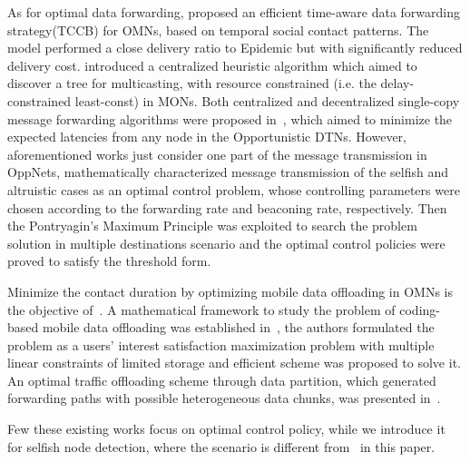As for optimal data forwarding,
\cite{DBLP:journals/tvt/ZhouLZXF17} proposed an
efficient time-aware data forwarding strategy(TCCB) for OMNs,
 based on temporal social contact patterns.
 The model performed a close delivery ratio to
 Epidemic but with significantly reduced delivery cost.
\cite{DBLP:journals/tvt/LiuWXWLY17} introduced
a centralized heuristic algorithm
which aimed to discover a tree for multicasting,
with resource constrained (i.e. the delay-constrained least-const) in MONs.
Both centralized and decentralized single-copy message forwarding algorithms
were proposed in~\cite{DBLP:journals/tsipn/ShaghaghianC15},
which aimed to minimize the expected latencies
from any node in the Opportunistic DTNs.
However, aforementioned works just consider one part of
the message transmission in OppNets,
\cite{DBLP:journals/tcss/WuDH18} mathematically characterized
message transmission of the selfish
and altruistic cases as an optimal control problem,
whose controlling parameters were chosen according
to the forwarding rate and beaconing rate, respectively.
Then the Pontryagin's Maximum Principle was exploited
to search the problem solution in multiple destinations scenario
and the optimal control policies were proved to satisfy the threshold form.

Minimize the contact duration by optimizing
mobile data offloading in OMNs is the objective
of~\cite{DBLP:journals/tits/LiJWZ014,DBLP:conf/icc/WangW18}.
A mathematical framework to study the problem of
coding-based mobile data offloading
was established in~\cite{DBLP:journals/tits/LiJWZ014},
the authors formulated the problem as a users' interest
satisfaction maximization problem
with multiple linear constraints of
limited storage and efficient scheme
was proposed to solve it.
An optimal traffic offloading scheme through
data partition, which generated forwarding paths
with possible heterogeneous data chunks,
was presented in~\cite{DBLP:conf/icc/WangW18}.
\cite{Sacha2016Stalk}

Few these existing works focus on
optimal control policy, while we introduce it
for selfish node detection,
where the scenario is different from~\cite{DBLP:journals/tcss/WuDH18} in this paper.

